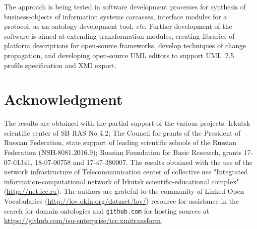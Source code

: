 \documentclass[runningheads]{llncs}
\begin{document}
The approach is being tested in software development processes for synthesis of business-objects of information systems carcasses, interface modules for a protocol, as an ontology development tool, \emph{etc.} Further development of the software is aimed at extending transformation modules, creating libraries of platform descriptions for open-source frameworks, develop techniques of change propagation, and developing open-source UML editors to support UML~2.5 profile specification \cite{uml25} and XMI export.


\section*{Acknowledgment}

The results are obtained with the partial support of the various projects: Irkutsk scientific center of SB RAS No 4.2;
The Council for grants of the President of Russian Federation, state support of leading scientific schools of the Russian Federation (NSH-8081.2016.9); Russian Foundation for Basic Research, grants 17-07-01341, 18-07-00758 and 17-47-380007. The results obtained with the use of the network infrastructure of Telecommunication center of collective use "Integrated information-computational network of Irkutsk scientific-educational complex" (\url{http://net.icc.ru}). The authors are grateful to the community of Linked Open Vocabularies (\url{http://lov.okfn.org/dataset/lov/}) resource for assistance in the search for domain ontologies and \texttt{github.com} for hosting sources at \url{https://github.com/isu-enterprise/icc.xmitransform}.
\end{document}
